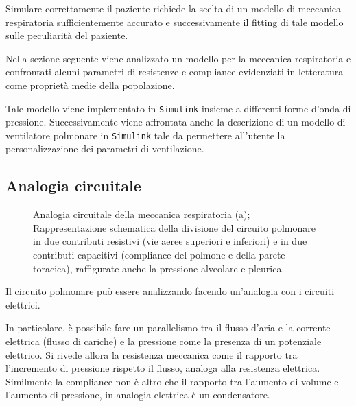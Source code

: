 Simulare correttamente il paziente richiede la scelta di un modello di meccanica respiratoria sufficientemente accurato e successivamente il fitting di tale modello sulle peculiarità del paziente.

Nella sezione seguente viene analizzato un modello per la meccanica respiratoria e confrontati alcuni parametri di resistenze e compliance evidenziati in letteratura come proprietà medie della popolazione.

Tale modello viene implementato in \texttt{Simulink} insieme a differenti forme d'onda di pressione. Successivamente viene affrontata anche la descrizione di un modello di ventilatore polmonare in  \texttt{Simulink} tale da permettere all'utente la personalizzazione dei parametri di ventilazione.



\subsection{Analogia circuitale}

\begin{figure}[t!]
	\begin{subfigure}{0.5\linewidth}
		\centering
		\small{
			\def\svgwidth{\linewidth}
			}
		\caption{}
		\label{fig:modello}
	\end{subfigure}\hfill
	\begin{subfigure}{0.5\linewidth}
		\centering
		\footnotesize{
			\def\svgwidth{0.7\linewidth}
			}
		\caption{}
	\end{subfigure}\hfill
	\caption{Analogia circuitale della meccanica respiratoria \cite{khoo_physiological_2018} (a); Rappresentazione schematica della divisione del circuito polmonare in due contributi resistivi (vie aeree superiori e inferiori) e in due contributi capacitivi (compliance del polmone e della parete toracica), raffigurate anche la pressione alveolare e pleurica.}
\end{figure}

Il circuito polmonare può essere analizzando facendo un'analogia con i circuiti elettrici.

In particolare, è possibile fare un parallelismo tra il flusso d'aria e la corrente elettrica (flusso di cariche) e la pressione come la presenza di un potenziale elettrico.
Si rivede allora la resistenza meccanica come il rapporto tra l'incremento di pressione rispetto il flusso, analoga alla resistenza elettrica. Similmente la compliance non è altro che il rapporto tra l'aumento di volume e l'aumento di pressione, in analogia elettrica è un condensatore.

